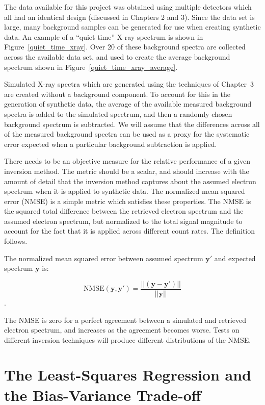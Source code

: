 The data available for this project was obtained using multiple detectors which all had an identical design (discussed in Chapters 2 and 3). Since the data set is large, many background samples can be generated for use when creating synthetic data. An example of a ``quiet time'' X-ray spectrum is shown in Figure~\ref{quiet_time_xray}. Over 20 of these background spectra are collected across the available data set, and used to create the average background spectrum shown in Figure~\ref{quiet_time_xray_average}.

Simulated X-ray spectra which are generated using the techniques of Chapter~3 are created without a background component. To account for this in the generation of synthetic data, the average of the available measured background spectra is added to the simulated spectrum, and then a randomly chosen background spectrum is subtracted. We will assume that the differences across all of the measured background spectra can be used as a proxy for the systematic error
expected when a particular background subtraction is applied. 

There needs to be an objective measure for the relative performance of a given inversion method. The metric should be a scalar, and should increase with the amount of detail that the inversion method captures about the assumed electron spectrum when it is applied to synthetic data. The normalized mean squared error (NMSE) is a simple metric which satisfies these properties. The NMSE is the squared total difference between the retrieved electron spectrum and the assumed electron spectrum, but normalized to the total signal magnitude to account for the fact that it is applied across different count rates. The definition follows.

\begin{definition}[NMSE]
The normalized mean squared error between assumed spectrum $\mathbf{y'}$ and expected spectrum $\mathbf{y}$ is: 

$$\mbox{NMSE}(\mathbf{y},\mathbf{y'}) = \frac{\vert \vert (\mathbf{y} - \mathbf{y'}) \vert \vert}{\vert \vert \mathbf{y} \vert \vert}$$.
\end{definition}

The NMSE is zero for a perfect agreement between a simulated and retrieved electron spectrum, and increases as the agreement becomes worse. Tests on different inversion techniques will produce different distributions of the NMSE.

\section{The Least-Squares Regression and the Bias-Variance Trade-off}

